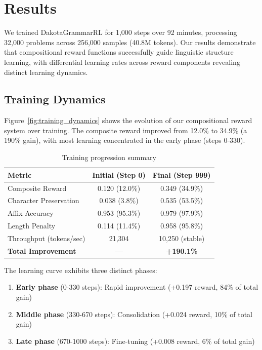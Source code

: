 \documentclass{article}
\begin{document}
\section{Results}

We trained DakotaGrammarRL for 1,000 steps over 92 minutes, processing 32,000 problems across 256,000 samples (40.8M tokens). Our results demonstrate that compositional reward functions successfully guide linguistic structure learning, with differential learning rates across reward components revealing distinct learning dynamics.

\subsection{Training Dynamics}

Figure~\ref{fig:training_dynamics} shows the evolution of our compositional reward system over training. The composite reward improved from 12.0\% to 34.9\% (a 190\% gain), with most learning concentrated in the early phase (steps 0-330).

\begin{table}[t]
\centering
\caption{Training progression summary}
\label{tab:training_summary}
\begin{tabular}{lcc}
\toprule
\textbf{Metric} & \textbf{Initial (Step 0)} & \textbf{Final (Step 999)} \\
\midrule
Composite Reward & 0.120 (12.0\%) & 0.349 (34.9\%) \\
Character Preservation & 0.038 (3.8\%) & 0.535 (53.5\%) \\
Affix Accuracy & 0.953 (95.3\%) & 0.979 (97.9\%) \\
Length Penalty & 0.114 (11.4\%) & 0.958 (95.8\%) \\
Throughput (tokens/sec) & 21,304 & 10,250 (stable) \\
\midrule
\textbf{Total Improvement} & \textbf{---} & \textbf{+190.1\%} \\
\bottomrule
\end{tabular}
\end{table}

The learning curve exhibits three distinct phases:
\begin{enumerate}
    \item \textbf{Early phase} (0-330 steps): Rapid improvement (+0.197 reward, 84\% of total gain)
    \item \textbf{Middle phase} (330-670 steps): Consolidation (+0.024 reward, 10\% of total gain)
    \item \textbf{Late phase} (670-1000 steps): Fine-tuning (+0.008 reward, 6\% of total gain)
\end{enumerate}
\end{document}
